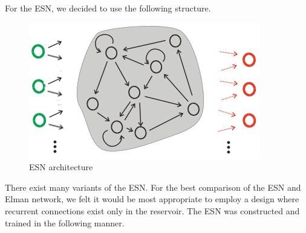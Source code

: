 \documentclass{acm_proc_article-sp}
\begin{document}
For the ESN, we decided to use the following structure.
\begin{figure}[here]
\begin{center}
\includegraphics[scale=0.35]{ESNStructure.png}
\caption{ESN architecture}
\end{center}
\label{fig:esn_structure}
\end{figure}
There exist many variants of the ESN. For the best comparison of the ESN and Elman network, we felt it would be most appropriate to employ a design where recurrent connections exist only in the reservoir. The ESN was constructed and trained in the following manner.
\end{document}
